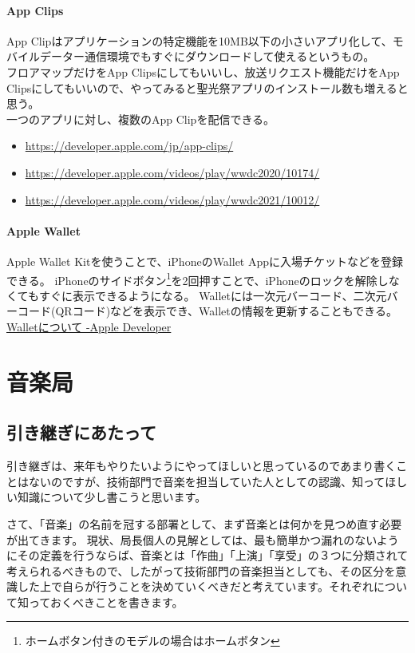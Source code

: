 \documentclass[a4paper]{ltjsreport}
\newcommand{\link}[2]{\href{#2}{#1}}
\newcommand{\Chapter}[1]{\chapter{#1}\thispagestyle{fancy}}
\begin{document}
\subsubsection{App Clips}
App Clipはアプリケーションの特定機能を10MB以下の小さいアプリ化して、モバイルデーター通信環境でもすぐにダウンロードして使えるというもの。\\
フロアマップだけをApp Clipsにしてもいいし、放送リクエスト機能だけをApp Clipsにしてもいいので、やってみると聖光祭アプリのインストール数も増えると思う。\\
一つのアプリに対し、複数のApp Clipを配信できる。\\
\begin{itemize}
  \item \url{https://developer.apple.com/jp/app-clips/}
  \item \url{https://developer.apple.com/videos/play/wwdc2020/10174/}
  \item \url{https://developer.apple.com/videos/play/wwdc2021/10012/}
\end{itemize}
\subsubsection{Apple Wallet}
Apple Wallet Kitを使うことで、iPhoneのWallet Appに入場チケットなどを登録できる。
iPhoneのサイドボタン\footnote{ホームボタン付きのモデルの場合はホームボタン}を2回押すことで、iPhoneのロックを解除しなくてもすぐに表示できるようになる。
Walletには一次元バーコード、二次元バーコード(QRコード)などを表示でき、Walletの情報を更新することもできる。\\
\link{Walletについて -Apple Developer}{https://developer.apple.com/jp/wallet/}

\Chapter{音楽局}
\section{引き継ぎにあたって}
引き継ぎは、来年もやりたいようにやってほしいと思っているのであまり書くことはないのですが、技術部門で音楽を担当していた人としての認識、知ってほしい知識について少し書こうと思います。

さて、「音楽」の名前を冠する部署として、まず音楽とは何かを見つめ直す必要が出てきます。
現状、局長個人の見解としては、最も簡単かつ漏れのないようにその定義を行うならば、音楽とは「作曲」「上演」「享受」の３つに分類されて考えられるべきもので、したがって技術部門の音楽担当としても、その区分を意識した上で自らが行うことを決めていくべきだと考えています。それぞれについて知っておくべきことを書きます。
\end{document}
